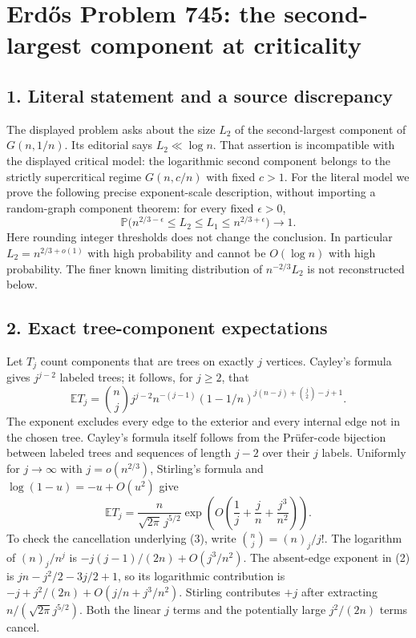 \section*{Erd\H{o}s Problem 745: the second-largest component at criticality}
\subsection*{1. Literal statement and a source discrepancy}
The displayed problem asks about the size $L_2$ of the second-largest component of $G(n,1/n)$. Its editorial says $L_2\ll\log n$. That assertion is incompatible with the displayed critical model: the logarithmic second component belongs to the strictly supercritical regime $G(n,c/n)$ with fixed $c>1$.
For the literal model we prove the following precise exponent-scale description, without importing a random-graph component theorem: for every fixed $\epsilon>0$,
\[
 \mathbb P\bigl(n^{2/3-\epsilon}\le L_2\le L_1\le n^{2/3+\epsilon}\bigr)\longrightarrow1. \tag{1}
\]
Here rounding integer thresholds does not change the conclusion. In particular $L_2=n^{2/3+o(1)}$ with high probability and cannot be $O(\log n)$ with high probability. The finer known limiting distribution of $n^{-2/3}L_2$ is not reconstructed below.
\subsection*{2. Exact tree-component expectations}
Let $T_j$ count components that are trees on exactly $j$ vertices. Cayley's formula gives $j^{j-2}$ labeled trees; it follows, for $j\ge2$, that
\[
 \mathbb E T_j=\binom nj j^{j-2}n^{-(j-1)}
 (1-1/n)^{j(n-j)+\binom j2-j+1}. \tag{2}
\]
The exponent excludes every edge to the exterior and every internal edge not in the chosen tree. Cayley's formula itself follows from the Pr\"ufer-code bijection between labeled trees and sequences of length $j-2$ over their $j$ labels.
Uniformly for $j\to\infty$ with $j=o(n^{2/3})$, Stirling's formula and $\log(1-u)=-u+O(u^2)$ give
\[
 \mathbb E T_j=\frac{n}{\sqrt{2\pi}\,j^{5/2}}
 \exp\!\left(O\left(\frac1j+\frac jn+\frac{j^3}{n^2}\right)\right). \tag{3}
\]
To check the cancellation underlying (3), write $\binom nj=(n)_j/j!$. The logarithm of $(n)_j/n^j$ is $-j(j-1)/(2n)+O(j^3/n^2)$. The absent-edge exponent in (2) is $jn-j^2/2-3j/2+1$, so its logarithmic contribution is $-j+j^2/(2n)+O(j/n+j^3/n^2)$. Stirling contributes $+j$ after extracting $n/(\sqrt{2\pi}j^{5/2})$. Both the linear $j$ terms and the potentially large $j^2/(2n)$ terms cancel.
